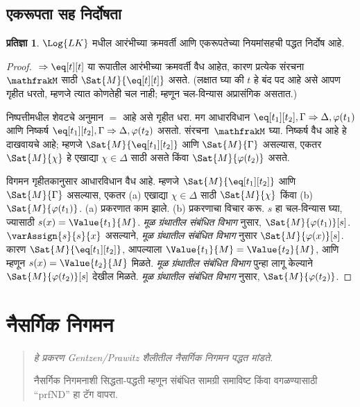 \documentclass[11pt,a4paper,openany]{book}
\theoremstyle{definition}
\newtheorem{prop}[defn]{प्रतिज्ञा}
\newenvironment{editorial}{\begin{quote}\small\itshape}{\end{quote}}
\newcommand{\applytofirst}[2]{{\expandafter#1#2}}
\newcommand{\Struct}[1]{\applytofirst{\mathfrak}{#1}}
\newcommand{\Sequent}{\Rightarrow}
\newcommand{\readerexternalref}[1]{\textit{मूळ ग्रंथातील संबंधित विभाग}}
\begin{document}
\section{एकरूपता सह निर्दोषता}\label{fol:seq:sid:sec}

\begin{prop}
$\Log{LK}$ मधील आरंभीच्या क्रमवर्ती आणि एकरूपतेच्या नियमांसहची पद्धत निर्दोष आहे.
\end{prop}

\begin{proof}
${} \Sequent \eq[t][t]$ या रूपातील आरंभीच्या क्रमवर्ती वैध आहेत, कारण
प्रत्येक संरचना~$\Struct M$ साठी $\Sat{M}{\eq[t][t]}$ असते. (लक्षात घ्या की
$t$ हे बंद पद आहे असे आपण गृहीत धरतो, म्हणजे त्यात कोणतेही चल नाही;
म्हणून चल-विन्यास अप्रासंगिक असतात.)

निष्पत्तीमधील शेवटचे अनुमान $=$ आहे असे गृहीत धरा. मग आधारविधान
$\eq[t_1][t_2], \Gamma \Sequent \Delta, \varphi(t_1)$ आणि निष्कर्ष
$\eq[t_1][t_2], \Gamma \Sequent \Delta, \varphi(t_2)$ असतो. संरचना~$\Struct M$
घ्या. निष्कर्ष वैध आहे हे दाखवायचे आहे; म्हणजे $\Sat{M}{\eq[t_1][t_2]}$ आणि
$\Sat{M}{\Gamma}$ असल्यास, एकतर $\Sat{M}{\chi}$ हे एखाद्या $\chi \in \Delta$ साठी
असते किंवा $\Sat{M}{\varphi(t_2)}$ असते.

विगमन गृहीतकानुसार आधारविधान वैध आहे. म्हणजे $\Sat{M}{\eq[t_1][t_2]}$ आणि
$\Sat{M}{\Gamma}$ असल्यास, एकतर (a) एखाद्या $\chi \in \Delta$ साठी
$\Sat{M}{\chi}$ किंवा (b) $\Sat{M}{\varphi(t_1)}$. (a) प्रकरणात काम झाले.
(b) प्रकरणाचा विचार करू. $s$ हा चल-विन्यास घ्या, ज्यासाठी
$s(x) = \Value{t_1}{M}$. \readerexternalref{fol:syn:ass:prop:sentence-sat-true} नुसार,
$\Sat{M}{\varphi(t_1)}[s]$. $\varAssign{s}{s}{x}$ असल्याने,
\readerexternalref{fol:syn:ext:prop:ext-formulas} नुसार $\Sat{M}{\varphi(x)}[s]$. कारण
$\Sat{M}{\eq[t_1][t_2]}$, आपल्याला $\Value{t_1}{M} = \Value{t_2}{M}$,
आणि म्हणून $s(x) = \Value{t_2}{M}$ मिळते. \readerexternalref{fol:syn:ext:prop:ext-formulas}
पुन्हा लागू केल्याने $\Sat{M}{\varphi(t_2)}[s]$ देखील मिळते.
\readerexternalref{fol:syn:ass:prop:sentence-sat-true} नुसार,
$\Sat{M}{\varphi(t_2)}$.
\end{proof}



\chapter{नैसर्गिक निगमन}\label{fol:ntd::chap}
\begin{editorial}
हे प्रकरण Gentzen/Prawitz शैलीतील नैसर्गिक निगमन पद्धत मांडते.

नैसर्गिक निगमनाशी सिद्धता-पद्धती म्हणून संबंधित सामग्री समाविष्ट किंवा
वगळण्यासाठी ``prfND'' हा टॅग वापरा.
\end{editorial}
\end{document}
